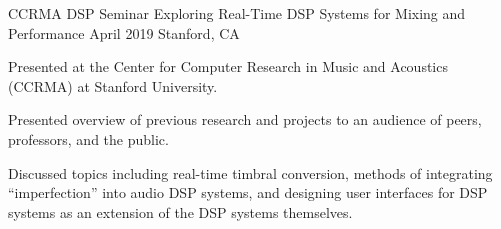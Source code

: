 \begin{cventries}
    \cventry
    {CCRMA DSP Seminar} %
    {Exploring Real-Time DSP Systems for Mixing and Performance} %
    {April 2019} %
    {Stanford, CA} %
    {
      \begin{cvitems} %
        \item {Presented at the Center for Computer Research in Music and Acoustics (CCRMA) at Stanford University.}
        \item {Presented overview of previous research and projects to an audience of peers, professors, and the public.}
        \item {Discussed topics including real-time timbral conversion, methods of integrating ``imperfection'' into audio
               DSP systems, and designing user interfaces for DSP systems as an extension of the DSP systems themselves.}
      \end{cvitems}
    }


\end{cventries}
